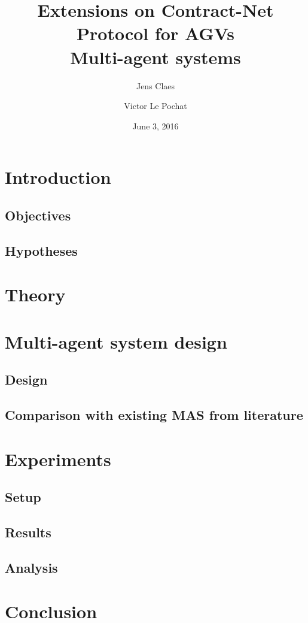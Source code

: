 \documentclass[10pt,a4paper]{article}
\title{Extensions on Contract-Net Protocol for AGVs \\ \normalsize Multi-agent systems}
\author{Jens Claes \and Victor Le Pochat}
\date{June 3, 2016}
\begin{document}
\maketitle

\section{Introduction}
\subsection{Objectives}
\subsection{Hypotheses}

\section{Theory}

\section{Multi-agent system design}
\subsection{Design}
\subsection{Comparison with existing MAS from literature}

\section{Experiments}
\subsection{Setup}
\subsection{Results}
\subsection{Analysis}

\section{Conclusion}
\end{document}
